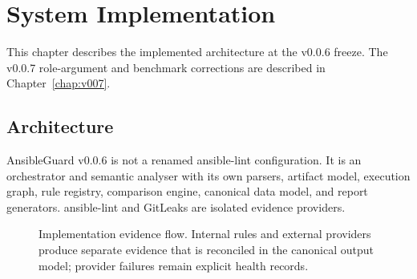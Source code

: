 \chapter{System Implementation}
This chapter describes the implemented architecture at the v0.0.6 freeze.
The v0.0.7 role-argument and benchmark corrections are described in
Chapter~\ref{chap:v007}.
\label{chap:implementation}

\section{Architecture}
AnsibleGuard v0.0.6 is not a renamed ansible-lint configuration. It is an
orchestrator and semantic analyser with its own parsers, artifact model,
execution graph, rule registry, comparison engine, canonical data model, and
report generators. ansible-lint and GitLeaks are isolated evidence providers.

\begin{figure}[H]
\centering
{}
\caption{Implementation evidence flow. Internal rules and external providers
produce separate evidence that is reconciled in the canonical output model;
provider failures remain explicit health records.}
\label{fig:implementation_architecture}
\end{figure}

